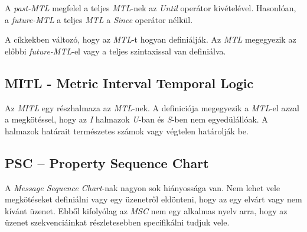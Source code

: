A \textit{past-MTL} megfelel a teljes \textit{MTL}-nek az \textit{Until} operátor kivételével.
Hasonlóan, a \textit{future-MTL} a teljes \textit{MTL} a \textit{Since} operátor nélkül.

A cíkkekben változó, hogy az \textit{MTL}-t hogyan definiálják.
Az \textit{MTL} megegyezik az előbbi \textit{future-MTL}-el vagy a teljes szintaxissal van definiálva.

\subsection{MITL - Metric Interval Temporal Logic}

Az \textit{MITL} egy részhalmaza az \textit{MTL}-nek.
A definiciója megegyezik a \textit{MTL}-el azzal a megkötéssel, hogy az \textit{I} halmazok \textit{U}-ban és \textit{S}-ben nem egyedülállóak.
A halmazok határait természetes számok vagy végtelen határolják be.

\subsection{PSC – Property Sequence Chart}
A \textit{Message Sequence Chart}-nak nagyon sok hiányossága van.
Nem lehet vele megkötéseket definiálni vagy egy üzenetről eldönteni, hogy az egy elvárt vagy nem kívánt üzenet.
Ebből kifolyólag az \textit{MSC} nem egy alkalmas nyelv arra, hogy az üzenet szekvenciáinkat részletesebben specifikálni tudjuk vele.

